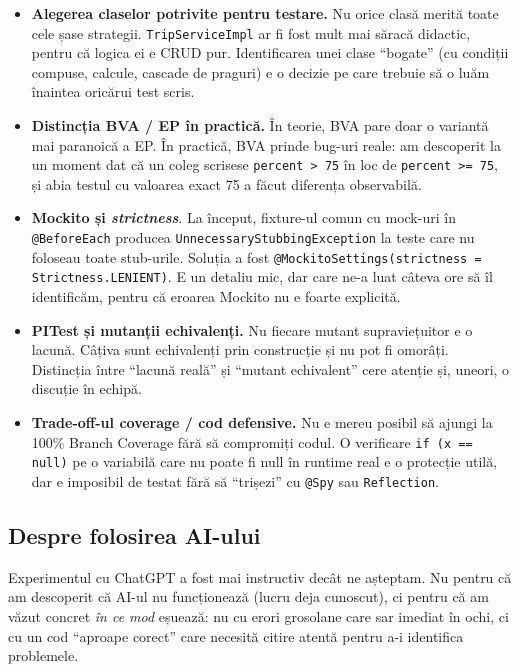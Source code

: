 \begin{itemize}
    \item \textbf{Alegerea claselor potrivite pentru testare.} Nu orice clasă merită toate cele șase strategii. \texttt{TripServiceImpl} ar fi fost mult mai săracă didactic, pentru că logica ei e CRUD pur. Identificarea unei clase \enquote{bogate} (cu condiții compuse, calcule, cascade de praguri) e o decizie pe care trebuie să o luăm înaintea oricărui test scris.

    \item \textbf{Distincția BVA / EP în practică.} În teorie, BVA pare doar o variantă mai paranoică a EP. În practică, BVA prinde bug-uri reale: am descoperit la un moment dat că un coleg scrisese \texttt{percent > 75} în loc de \texttt{percent >= 75}, și abia testul cu valoarea exact 75 a făcut diferența observabilă.

    \item \textbf{Mockito și \textit{strictness}}. La început, fixture-ul comun cu mock-uri în \texttt{@BeforeEach} producea \texttt{UnnecessaryStubbingException} la teste care nu foloseau toate stub-urile. Soluția a fost \texttt{@MockitoSettings(strictness = Strictness.LENIENT)}. E un detaliu mic, dar care ne-a luat câteva ore să îl identificăm, pentru că eroarea Mockito nu e foarte explicită.

    \item \textbf{PITest și mutanții echivalenți.} Nu fiecare mutant supraviețuitor e o lacună. Câțiva sunt echivalenți prin construcție și nu pot fi omorâți. Distincția între \enquote{lacună reală} și \enquote{mutant echivalent} cere atenție și, uneori, o discuție în echipă.

    \item \textbf{Trade-off-ul coverage / cod defensive.} Nu e mereu posibil să ajungi la 100\% Branch Coverage fără să compromiți codul. O verificare \texttt{if (x == null)} pe o variabilă care nu poate fi null în runtime real e o protecție utilă, dar e imposibil de testat fără să \enquote{trișezi} cu \texttt{@Spy} sau \texttt{Reflection}.
\end{itemize}

\subsection{Despre folosirea AI-ului}

Experimentul cu ChatGPT a fost mai instructiv decât ne așteptam. Nu pentru că am descoperit că AI-ul nu funcționează (lucru deja cunoscut), ci pentru că am văzut concret \textit{în ce mod} eșuează: nu cu erori grosolane care sar imediat în ochi, ci cu un cod \enquote{aproape corect} care necesită citire atentă pentru a-i identifica problemele.

